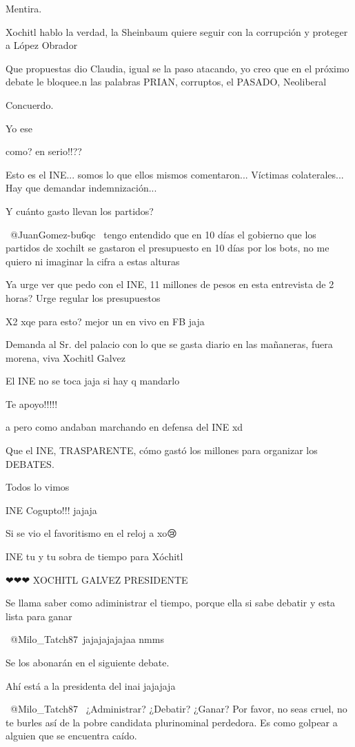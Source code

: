 Mentira.

Xochitl hablo la verdad, la Sheinbaum quiere seguir con la corrupción y proteger a López Obrador

Que propuestas dio Claudia, igual se la paso atacando, yo creo que en el próximo debate le bloquee.n las palabras PRIAN, corruptos, el PASADO, Neoliberal

Concuerdo.

Yo ese

como? en serio!!??

Esto es el INE... somos lo que ellos mismos comentaron... Víctimas colaterales... Hay que demandar indemnización...

Y cuánto gasto llevan los partidos? 🤑

​ @JuanGomez-bu6qc  tengo entendido que en 10 días el gobierno que los partidos de xochilt se gastaron el presupuesto en 10 días por los bots, no me quiero ni imaginar la cifra a estas alturas

Ya urge ver que pedo con el INE, 11 millones de pesos en esta entrevista de 2 horas? Urge regular los presupuestos

X2 xqe para esto? mejor un en vivo en FB jaja

Demanda al Sr. del palacio con lo que se gasta diario en las mañaneras, fuera morena, viva Xochitl Galvez

El INE no se toca jaja si hay q mandarlo

Te apoyo!!!!!

a pero como andaban marchando en defensa del INE xd

Que el INE, TRASPARENTE, cómo gastó los millones para organizar los DEBATES.

Todos lo vimos

INE Cogupto!!! jajaja

Si se vio el favoritismo en el reloj a xo😢

INE tu y tu sobra de tiempo para Xóchitl

❤❤❤ XOCHITL GALVEZ PRESIDENTE

Se llama saber como adiministrar el tiempo, porque ella si sabe debatir y esta lista para ganar

​ @Milo_Tatch87 jajajajajajaa nmms

Se los abonarán en el siguiente debate.

Ahí está a la presidenta del inai jajajaja

 @Milo_Tatch87  ¿Administrar? ¿Debatir? ¿Ganar?     Por favor, no seas cruel, no te burles así de la pobre candidata plurinominal perdedora.   Es como golpear a alguien que se encuentra caído.

